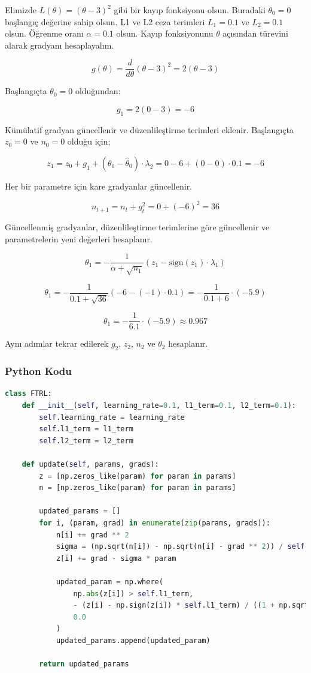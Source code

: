 Elimizde $L(\theta) = (\theta - 3)^2$ gibi bir kayıp fonksiyonu olsun. Buradaki $\theta_0 = 0$ başlangıç değerine sahip olsun. L1 ve L2 ceza terimleri $L_1 = 0.1$ ve $L_2 = 0.1$ olsun. Öğrenme oranı $\alpha = 0.1$ olsun. Kayıp fonksiyonunu $\theta$ açısından türevini alarak gradyanı hesaplayalım.

\[ g(\theta) = \frac{d}{d \theta} (\theta - 3)^2 = 2 (\theta - 3) \]

Başlangıçta $\theta_0 = 0$ olduğundan:

\[ g_1 = 2 (0 - 3) = -6 \]

Kümülatif gradyan güncellenir ve düzenlileştirme terimleri eklenir. Başlangıçta $z_0 = 0$ ve $n_0 = 0$ olduğu için;

\[ z_1 = z_0 + g_1 + (\theta_0 - \hat{\theta}_0) \cdot \lambda_2 = 0 - 6 + (0 - 0) \cdot 0.1 = -6 \]

Her bir parametre için kare gradyanlar güncellenir.

\[ n_{t+1} = n_t + g_{t}^2 = 0 + (-6)^2 = 36 \]

Güncellenmiş gradyanlar, düzenlileştirme terimlerine göre güncellenir ve parametrelerin yeni değerleri hesaplanır.

\[ \theta_1 = - \frac{1}{\alpha + \sqrt{n_1}} (z_1 - \text{sign}(z_1) \cdot \lambda_1) \]

\[ \theta_1 = - \frac{1}{0.1 + \sqrt{36}} (-6 - (-1) \cdot 0.1) = - \frac{1}{0.1 + 6} \cdot (-5.9) \]

\[ \theta_1 = - \frac{1}{6.1} \cdot (-5.9) \approx 0.967 \]

Aynı adımlar tekrar edilerek $g_2$, $z_2$, $n_2$ ve $\theta_2$ hesaplanır.

\subsubsection{Python Kodu}

\begin{lstlisting}[language=Python]
class FTRL:
    def __init__(self, learning_rate=0.1, l1_term=0.1, l2_term=0.1):
        self.learning_rate = learning_rate
        self.l1_term = l1_term
        self.l2_term = l2_term

    def update(self, params, grads):
        z = [np.zeros_like(param) for param in params]
        n = [np.zeros_like(param) for param in params]
        
        updated_params = []
        for i, (param, grad) in enumerate(zip(params, grads)):
            n[i] += grad ** 2
            sigma = (np.sqrt(n[i]) - np.sqrt(n[i] - grad ** 2)) / self.learning_rate
            z[i] += grad - sigma * param

            updated_param = np.where(
                np.abs(z[i]) > self.l1_term,
                - (z[i] - np.sign(z[i]) * self.l1_term) / ((1 + np.sqrt(n[i])) / self.learning_rate + self.l2_term),
                0.0
            )
            updated_params.append(updated_param)
        
        return updated_params
\end{lstlisting}

